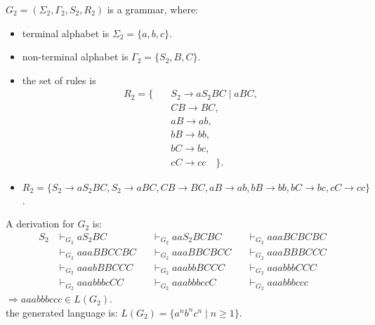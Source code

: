 \documentclass[a4paper,11pt,utf8]{article}
\newcommand{\lineindent}{\hspace*{\parindent}}
\begin{document}
\begin{tcolorbox}[title=example 3,colback=white,colframe=black,width=\textwidth,arc=0pt]
    $G_2 = (\Sigma_2, \Gamma_2, S_2, R_2)$ is a grammar, where:
    \begin{itemize}
        \item terminal alphabet is $\Sigma_2 = \{a,b,c\}$.
        \item non-terminal alphabet is $\Gamma_2 = \{S_2, B,C\}$.
        \item the set of rules is \[
            \begin{aligned}
                R_2 = \{ \quad & S_2 \to a S_2 BC \mid aBC, \\[1ex]
                & CB \to BC, \\[1ex]
                & aB \to ab, \\[1ex]
                & bB \to bb, \\[1ex]
                & bC \to bc, \\[1ex]
                & cC \to cc \quad \}.
            \end{aligned}
            \]
        \item $R_2 = \{S_2 \to a S_2 BC, S_2 \to aBC, CB \to BC, aB \to ab, bB \to bb, bC \to bc, cC \to cc\}$.
    \end{itemize}
    A derivation for $G_2$ is:
    \[
        \begin{aligned}
            S_2 &\vdash_{G_2} a S_2 BC  &&\vdash_{G_2} aa S_2 BCBC &&\vdash_{G_2} aaaBCBCBC \\[1ex]
                &\vdash_{G_2} aaaBBCCBC &&\vdash_{G_2} aaaBBCBCC   &&\vdash_{G_2} aaaBBBCCC \\[1ex]
                &\vdash_{G_2} aaabBBCCC &&\vdash_{G_2} aaabbBCCC   &&\vdash_{G_2} aaabbbCCC \\[1ex]
                &\vdash_{G_2} aaabbbcCC &&\vdash_{G_2} aaabbbccC   &&\vdash_{G_2} aaabbbccc
        \end{aligned}
    \]
    $\Rightarrow aaabbbccc \in L(G_2)$. \\
    \lineindent the generated language is: $L(G_2) = \{a^nb^nc^n \mid n \geq 1\}$.
\end{tcolorbox}
\end{document}
